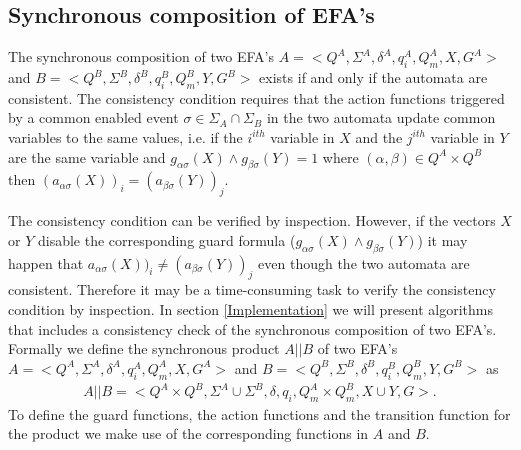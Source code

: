 \documentclass{article}
\begin{document}
\subsection{Synchronous composition of EFA's}
The synchronous composition of two EFA's $A=<Q^A, \Sigma^A,
\delta^A, q^A_i, Q^A_m, X, G^A>$ and $B=<Q^B, \Sigma^B, \delta^B,
q^B_i, Q^B_m, Y, G^B>$ exists if and only if the automata are
consistent. The consistency condition requires that the action
functions triggered by a common enabled  event $\sigma\in
\Sigma_{A}\cap \Sigma_{B}$ in the two automata update common
variables to the same values, i.e. if the $i^{ith}$ variable in
$X$ and the $j^{ith}$ variable in $Y$ are the same variable and
$g_{\alpha \sigma}(X)\wedge g_{\beta \sigma}(Y)=1$ where
$(\alpha,\beta)\in Q^A\times Q^B$ then $(a_{\alpha \sigma}(X))_i =
(a_{\beta \sigma}(Y))_j$.

The consistency condition can be verified by inspection. However,
if the vectors $X$ or $Y$ disable the corresponding guard formula
($g_{\alpha \sigma}(X)\wedge g_{\beta \sigma}(Y)$) it may happen
that $a_{\alpha \sigma}(X))_i \neq (a_{\beta \sigma}(Y))_j$ even
though the two automata are consistent. Therefore it may be a
time-consuming task to verify the consistency condition by
inspection. In section \ref{Implementation} we will present
algorithms that includes a consistency check of the synchronous
composition of two EFA's. \\

Formally we define the synchronous product $A||B$ of two EFA's
$A=<Q^A, \Sigma^A, \delta^A, q^A_i, Q^A_m, X, G^A>$ and $B=<Q^B,
\Sigma^B, \delta^B, q^B_i, Q^B_m, Y, G^B>$ as
\begin{eqnarray}
A||B=<Q^A\times Q^B, \Sigma^A \cup \Sigma^B , \delta, q_i,
Q^A_m\times Q^B_m, X \cup Y, G>.
\end{eqnarray}
To define the guard functions, the action functions and the
transition function for the product we make use of the
corresponding functions in $A$ and $B$.
\end{document}
